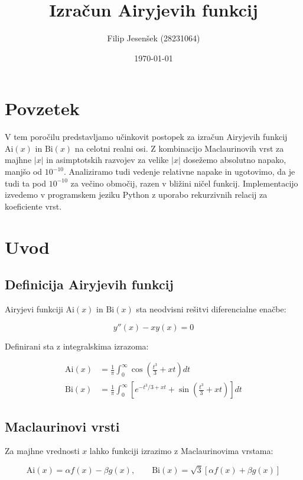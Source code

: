 \documentclass[12pt,a4paper]{article}
\title{Izračun Airyjevih funkcij}
\author{Filip Jesenšek (28231064)}
\date{\today}
\newcommand{\Ai}{\mathrm{Ai}}
\newcommand{\Bi}{\mathrm{Bi}}
\begin{document}
\maketitle

\section*{Povzetek}
V tem poročilu predstavljamo učinkovit postopek za izračun Airyjevih funkcij $\Ai(x)$ in $\Bi(x)$ na celotni realni osi. Z kombinacijo Maclaurinovih vrst za majhne $|x|$ in asimptotskih razvojev za velike $|x|$ dosežemo absolutno napako, manjšo od $10^{-10}$. Analiziramo tudi vedenje relativne napake in ugotovimo, da je tudi ta pod $10^{-10}$ za večino območij, razen v bližini ničel funkcij. Implementacijo izvedemo v programskem jeziku Python z uporabo rekurzivnih relacij za koeficiente vrst.

\section{Uvod}

\subsection{Definicija Airyjevih funkcij}
Airyjevi funkciji $\Ai(x)$ in $\Bi(x)$ sta neodvisni rešitvi diferencialne enačbe:

\begin{equation}
y''(x) - xy(x) = 0
\end{equation}

Definirani sta z integralskima izrazoma:

\begin{align}
\Ai(x) &= \frac{1}{\pi} \int_0^\infty \cos\left(\frac{t^3}{3} + xt\right) dt \\
\Bi(x) &= \frac{1}{\pi} \int_0^\infty \left[ e^{-t^3/3 + xt} + \sin\left(\frac{t^3}{3} + xt\right) \right] dt
\end{align}

\subsection{Maclaurinovi vrsti}
Za majhne vrednosti $x$ lahko funkciji izrazimo z Maclaurinovima vrstama:

\begin{equation}
\Ai(x) = \alpha f(x) - \beta g(x), \qquad \Bi(x) = \sqrt{3}\left[\alpha f(x) + \beta g(x)\right]
\end{equation}
\end{document}
